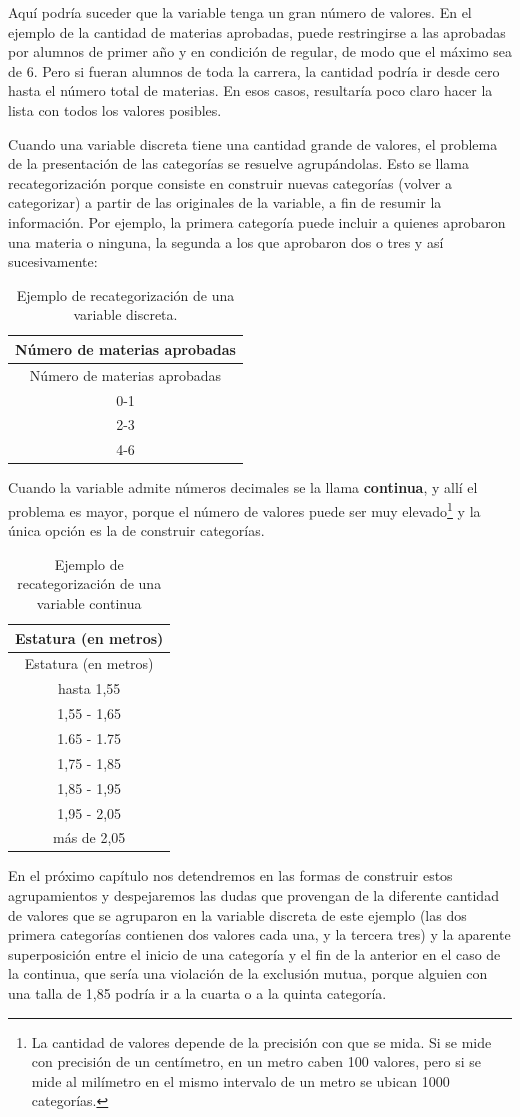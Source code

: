 \documentclass[]{book}
\let\rmarkdownfootnote\footnote%
\def\footnote{\protect\rmarkdownfootnote}
\begin{document}
Aquí podría suceder que la variable tenga un gran número de valores. En el ejemplo de la cantidad de materias aprobadas, puede restringirse a las aprobadas por alumnos de primer año y en condición de regular, de modo que el máximo sea de 6. Pero si fueran alumnos de toda la carrera, la cantidad podría ir desde cero hasta el número total de materias. En esos casos, resultaría poco claro hacer la lista con todos los valores posibles.

Cuando una variable discreta tiene una cantidad grande de valores, el problema de la presentación de las categorías se resuelve agrupándolas. Esto se llama recategorización porque consiste en construir nuevas categorías (volver a categorizar) a partir de las originales de la variable, a fin de resumir la información. Por ejemplo, la primera categoría puede incluir a quienes aprobaron una materia o ninguna, la segunda a los que aprobaron dos o tres y así sucesivamente:

\begin{longtable}[]{@{}c@{}}
\caption{\label{tab:unnamed-chunk-33}Ejemplo de recategorización de una variable discreta.}\tabularnewline
\toprule
Número de materias aprobadas\tabularnewline
\midrule
\endfirsthead
\toprule
Número de materias aprobadas\tabularnewline
\midrule
\endhead
0-1\tabularnewline
2-3\tabularnewline
4-6\tabularnewline
\bottomrule
\end{longtable}

Cuando la variable admite números decimales se la llama \textbf{continua}, y allí el problema es mayor, porque el número de valores puede ser muy elevado\footnote{La cantidad de valores depende de la precisión con que se mida. Si se mide con precisión de un centímetro, en un metro caben 100 valores, pero si se mide al milímetro en el mismo intervalo de un metro se ubican 1000 categorías.} y la única opción es la de construir categorías.

\begin{longtable}[]{@{}c@{}}
\caption{\label{tab:unnamed-chunk-34}Ejemplo de recategorización de una variable continua}\tabularnewline
\toprule
Estatura (en metros)\tabularnewline
\midrule
\endfirsthead
\toprule
Estatura (en metros)\tabularnewline
\midrule
\endhead
hasta 1,55\tabularnewline
1,55 - 1,65\tabularnewline
1.65 - 1.75\tabularnewline
1,75 - 1,85\tabularnewline
1,85 - 1,95\tabularnewline
1,95 - 2,05\tabularnewline
más de 2,05\tabularnewline
\bottomrule
\end{longtable}

En el próximo capítulo nos detendremos en las formas de construir estos agrupamientos y despejaremos las dudas que provengan de la diferente cantidad de valores que se agruparon en la variable discreta de este ejemplo (las dos primera categorías contienen dos valores cada una, y la tercera tres) y la aparente superposición entre el inicio de una categoría y el fin de la anterior en el caso de la continua, que sería una violación de la exclusión mutua, porque alguien con una talla de 1,85 podría ir a la cuarta o a la quinta categoría.
\end{document}
